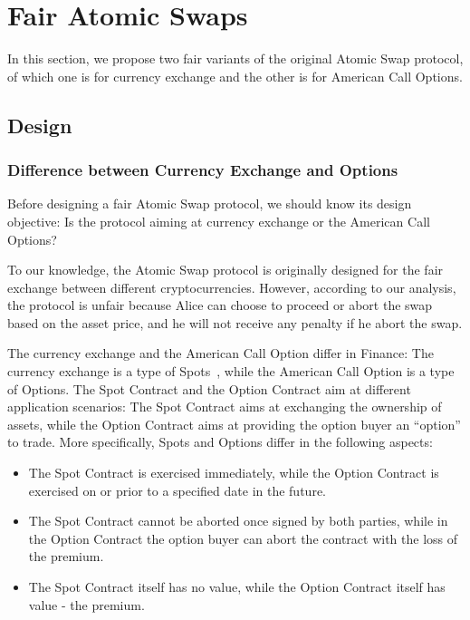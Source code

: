 \section{Fair Atomic Swaps}
\label{sec:fair_atomic_swap}

In this section, we propose two fair variants of the original Atomic Swap protocol, of which one is for currency exchange and the other is for American Call Options.


\subsection{Design}

\subsubsection{Difference between Currency Exchange and Options}
\label{subsubsec:diff_spot_option}

Before designing a fair Atomic Swap protocol, we should know its design objective:
Is the protocol aiming at currency exchange or the American Call Options?

To our knowledge, the Atomic Swap protocol is originally designed for the fair exchange between different cryptocurrencies.
However, according to our analysis, the protocol is unfair because Alice can choose to proceed or abort the swap based on the asset price, and he will not receive any penalty if he abort the swap.

The currency exchange and the American Call Option differ in Finance: The currency exchange is a type of Spots~\cite{hull1991introduction}, while the American Call Option is a type of Options.
The Spot Contract and the Option Contract aim at different application scenarios: The Spot Contract aims at exchanging the ownership of assets, while the Option Contract aims at providing the option buyer an ``option'' to trade.
More specifically, Spots and Options differ in the following aspects:

\begin{itemize}
    \item The Spot Contract is exercised immediately, while the Option Contract is exercised on or prior to a specified date in the future.
    \item The Spot Contract cannot be aborted once signed by both parties, while in the Option Contract the option buyer can abort the contract with the loss of the premium.
    \item The Spot Contract itself has no value, while the Option Contract itself has value - the premium.
\end{itemize}


